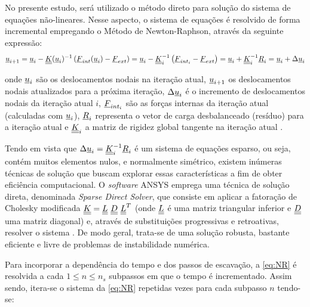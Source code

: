 No presente estudo, será utilizado o método direto para solução do sistema de equações não-lineares. Nesse aspecto, o sistema de equações é resolvido de forma incremental empregando o Método de Newton-Raphson, através da seguinte expressão:
\begin{equation}
	\label{eq:NR}
	\underline u_{i+1} = \underline u_i - \underline{\underline K}(\underline u_i)^{-1}\left(\underline{F}_{int}(\underline u_i)-\underline{F}_{ext} \right) = \underline u_i - \underline{\underline K}_i^{-1} \left(\underline{F}_{int_i} - \underline{F}_{ext} \right) = \underline u_i + \underline{\underline K}_i^{-1}\underline{R}_i = \underline u_i + \Delta \underline u_i
\end{equation}

onde $\underline u_i$ são os deslocamentos nodais na iteração atual, $\underline u_{i+1}$ os deslocamentos nodais atualizados para a próxima iteração, $\Delta \underline u_i$ é o incremento de deslocamentos nodais da iteração atual $i$, $\underline{F}_{int_i}$ são as forças internas da iteração atual (calculadas com $\underline u_i$), $\underline{R}_i$ representa o vetor de carga desbalanceado (resíduo) para a iteração atual e $\underline{\underline K}_i$ a matriz de rigidez global tangente na iteração atual \cite{ANSYS2018}.

Tendo em vista que $\Delta \underline u_i = \underline{\underline K}_i^{-1}\underline{R}_i$ é um sistema de equações esparso, ou seja, contém muitos elementos nulos, e normalmente simétrico, existem inúmeras técnicas de solução que buscam explorar essas características a fim de obter eficiência computacional. O \textit{software} ANSYS emprega uma técnica de solução direta, denominada \textit{Sparse Direct Solver}, que consiste em aplicar a fatoração de Cholesky modificada $\underline{\underline K} = \underline{\underline L}~\underline{\underline D}~ \underline{\underline L}^T$ (onde $\underline{\underline L}$ é uma matriz triangular inferior e $\underline{\underline D}$ uma matriz diagonal) e, através de substituições progressivas e retroativas, resolver o sistema \cite{ANSYS2018}. De modo geral, trata-se de uma solução robusta, bastante eficiente e livre de problemas de instabilidade numérica.

Para incorporar a dependência do tempo e dos passos de escavação, a \autoref{eq:NR} é resolvida a cada $1 \le n \le n_s$ subpassos em que o tempo é incrementado. Assim sendo, itera-se o sistema da \autoref{eq:NR} repetidas vezes para cada subpasso $n$ tendo-se:


